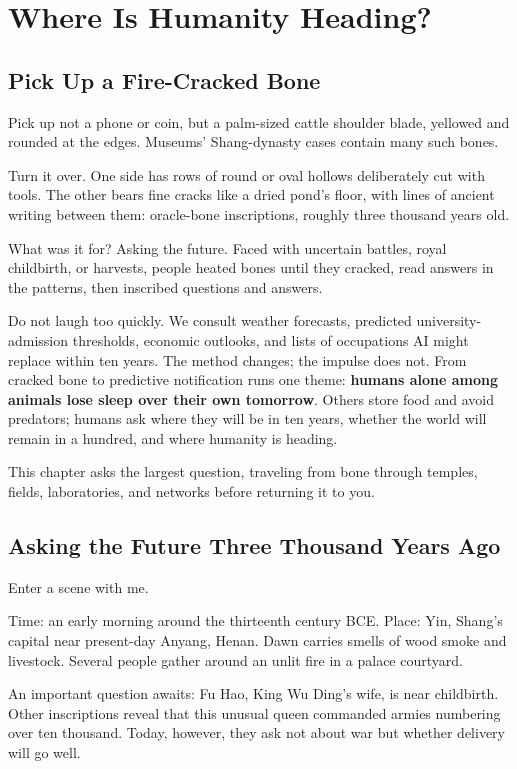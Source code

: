\chapter{Where Is Humanity Heading?}
\section{Pick Up a Fire-Cracked Bone}
Pick up not a phone or coin, but a palm-sized cattle shoulder blade, yellowed and rounded at the edges. Museums' Shang-dynasty cases contain many such bones.

Turn it over. One side has rows of round or oval hollows deliberately cut with tools. The other bears fine cracks like a dried pond's floor, with lines of ancient writing between them: oracle-bone inscriptions, roughly three thousand years old.

What was it for? Asking the future. Faced with uncertain battles, royal childbirth, or harvests, people heated bones until they cracked, read answers in the patterns, then inscribed questions and answers.

Do not laugh too quickly. We consult weather forecasts, predicted university-admission thresholds, economic outlooks, and lists of occupations AI might replace within ten years. The method changes; the impulse does not. From cracked bone to predictive notification runs one theme: \textbf{humans alone among animals lose sleep over their own tomorrow}. Others store food and avoid predators; humans ask where they will be in ten years, whether the world will remain in a hundred, and where humanity is heading.

This chapter asks the largest question, traveling from bone through temples, fields, laboratories, and networks before returning it to you.

\section{Asking the Future Three Thousand Years Ago}
Enter a scene with me.

Time: an early morning around the thirteenth century BCE. Place: Yin, Shang's capital near present-day Anyang, Henan. Dawn carries smells of wood smoke and livestock. Several people gather around an unlit fire in a palace courtyard.

An important question awaits: Fu Hao, King Wu Ding's wife, is near childbirth. Other inscriptions reveal that this unusual queen commanded armies numbering over ten thousand. Today, however, they ask not about war but whether delivery will go well.

